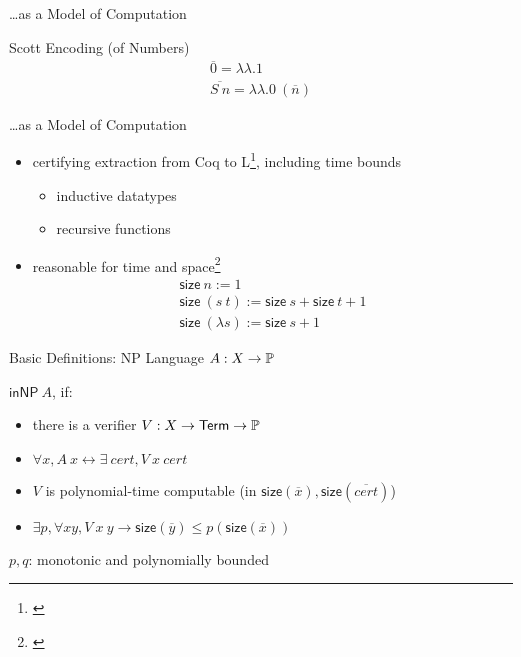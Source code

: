 \documentclass[11pt,usenames,dvipsnames,
  hyperref={pdfencoding=auto,psdextra}]{beamer}
\begin{document}
\begin{frame}{\ldots as a Model of Computation}
  \begin{block}{Scott Encoding (of Numbers)}
    \vspace{-1ex}
    \begin{align*} 
      \overline{0} = \lambda\lambda. 1\\
      \overline{S~n} = \lambda\lambda. 0~(\overline n)
    \end{align*}
    \vspace{-1ex}
  \end{block}
\end{frame}
\begin{frame}[noframenumbering]{\ldots as a Model of Computation}

  \begin{itemize}
    \item certifying extraction from Coq to L\footnote{\cite{ForsterKunze:2019:Certifying-extraction}}, including time bounds
      \begin{itemize}
        \item inductive datatypes
        \item recursive functions
      \end{itemize}
    \item<2-> reasonable for time and space\footnote{\cite{ForsterKunzeRoth:2019:wcbv-Reasonable}}
      \begin{gather*}
        \textsf{size}~n := 1 \\
        \textsf{size}~(s~t) := \textsf{size}~s + \textsf{size}~t + 1 \\ 
        \textsf{size}~(\lambda s) := \textsf{size}~s + 1
      \end{gather*}
  \end{itemize}

\end{frame}

\begin{frame}{Basic Definitions: NP}
  Language $A : X \rightarrow \mathbb{P}$

  \vspace{2ex}
  $\textsf{inNP}~A$, if:
  \begin{itemize}
    \item there is a verifier $V : X \rightarrow \textsf{Term} \rightarrow \mathbb{P}$
    \item $\forall x, A~x \leftrightarrow \exists~\mathit{cert}, V~x~\mathit{cert}$
    \item $V$ is polynomial-time computable (in $\textsf{size}(\overline x), \textsf{size}(\overline{cert})$)
    \item $\exists p, \forall x y, V~x~y \rightarrow \textsf{size}(\overline y) \le p(\textsf{size}(\overline x))$
  \end{itemize}
  \vspace{2ex}
  $p,q$: monotonic and polynomially bounded
\end{frame}
\end{document}

